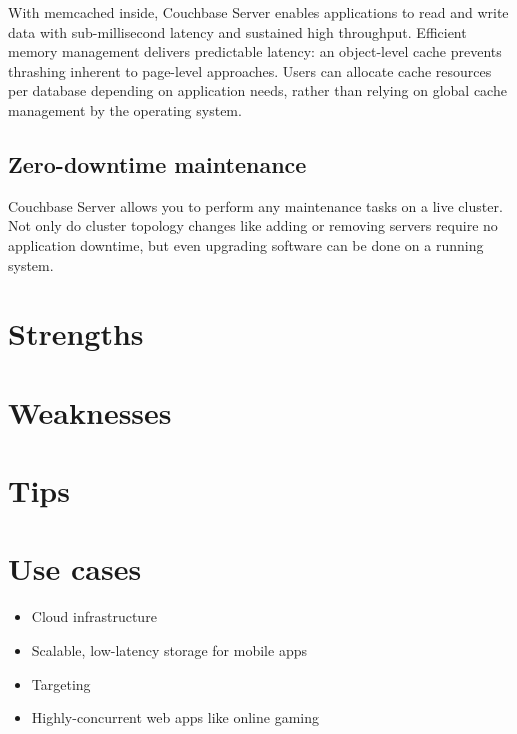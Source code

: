 With memcached inside, Couchbase Server enables applications to read and write data with sub-millisecond latency and sustained high throughput. Efficient memory management delivers predictable latency: an object-level cache prevents thrashing inherent to page-level approaches. Users can allocate cache resources per database depending on application needs, rather than relying on global cache management by the operating system.

\subsection{Zero-downtime maintenance}

Couchbase Server allows you to perform any maintenance tasks on a live cluster. Not only do cluster topology changes like adding or removing servers require no application downtime, but even upgrading software can be done on a running system.

\section{Strengths}

\section{Weaknesses}

\section{Tips}

\section{Use cases}

\begin{itemize}
  \item Cloud infrastructure
  \item Scalable, low-latency storage for mobile apps
  \item Targeting
  \item Highly-concurrent web apps like online gaming
\end{itemize}